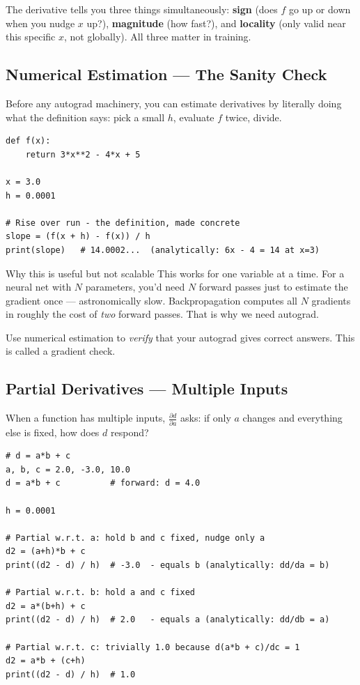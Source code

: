 \documentclass[12pt,a4paper]{article}
\begin{document}
\begin{intuitionbox}
The derivative tells you three things simultaneously: \textbf{sign} (does $f$ go up or down when you nudge $x$ up?), \textbf{magnitude} (how fast?), and \textbf{locality} (only valid near this specific $x$, not globally). All three matter in training.
\end{intuitionbox}

\subsection{Numerical Estimation — The Sanity Check}

Before any autograd machinery, you can estimate derivatives by literally doing what the definition says: pick a small $h$, evaluate $f$ twice, divide.

\begin{lstlisting}
def f(x):
    return 3*x**2 - 4*x + 5

x = 3.0
h = 0.0001

# Rise over run - the definition, made concrete
slope = (f(x + h) - f(x)) / h
print(slope)   # 14.0002...  (analytically: 6x - 4 = 14 at x=3)
\end{lstlisting}

\begin{codeexplainbox}{Why this is useful but not scalable}
This works for one variable at a time. For a neural net with $N$ parameters, you'd need $N$ forward passes just to estimate the gradient once — astronomically slow. Backpropagation computes all $N$ gradients in roughly the cost of \emph{two} forward passes. That is why we need autograd.

Use numerical estimation to \emph{verify} that your autograd gives correct answers. This is called a gradient check.
\end{codeexplainbox}

\subsection{Partial Derivatives — Multiple Inputs}

When a function has multiple inputs, $\frac{\partial d}{\partial a}$ asks: if only $a$ changes and everything else is fixed, how does $d$ respond?

\begin{lstlisting}
# d = a*b + c
a, b, c = 2.0, -3.0, 10.0
d = a*b + c          # forward: d = 4.0

h = 0.0001

# Partial w.r.t. a: hold b and c fixed, nudge only a
d2 = (a+h)*b + c
print((d2 - d) / h)  # -3.0  - equals b (analytically: dd/da = b)

# Partial w.r.t. b: hold a and c fixed
d2 = a*(b+h) + c
print((d2 - d) / h)  # 2.0   - equals a (analytically: dd/db = a)

# Partial w.r.t. c: trivially 1.0 because d(a*b + c)/dc = 1
d2 = a*b + (c+h)
print((d2 - d) / h)  # 1.0
\end{lstlisting}
\end{document}

